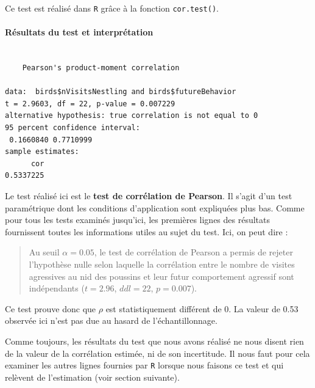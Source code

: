 \documentclass[a4paperpaper,]{article}
\newenvironment{Shaded}{\begin{snugshade}}{\end{snugshade}}
\newcommand{\KeywordTok}[1]{\textcolor[rgb]{0.12,0.11,0.11}{\textbf{#1}}}
\newcommand{\NormalTok}[1]{\textcolor[rgb]{0.12,0.11,0.11}{#1}}
\newcommand{\OperatorTok}[1]{\textcolor[rgb]{0.12,0.11,0.11}{#1}}
\let\oldparagraph\paragraph
\renewcommand{\paragraph}[1]{\oldparagraph{#1}\mbox{}}
\begin{document}
Ce test est réalisé dans \texttt{R} grâce à la fonction \texttt{cor.test()}.

\hypertarget{ruxe9sultats-du-test-et-interpruxe9tation}{%
\paragraph{Résultats du test et interprétation}\label{ruxe9sultats-du-test-et-interpruxe9tation}}

\begin{Shaded}
\end{Shaded}

\begin{verbatim}

    Pearson's product-moment correlation

data:  birds$nVisitsNestling and birds$futureBehavior
t = 2.9603, df = 22, p-value = 0.007229
alternative hypothesis: true correlation is not equal to 0
95 percent confidence interval:
 0.1660840 0.7710999
sample estimates:
      cor 
0.5337225 
\end{verbatim}

Le test réalisé ici est le \textbf{test de corrélation de Pearson}. Il s'agit d'un test paramétrique dont les conditions d'application sont expliquées plus bas. Comme pour tous les tests examinés jusqu'ici, les premières lignes des résultats fournissent toutes les informations utiles au sujet du test. Ici, on peut dire :

\begin{quote}
Au seuil \(\alpha = 0.05\), le test de corrélation de Pearson a permis de rejeter l'hypothèse nulle selon laquelle la corrélation entre le nombre de visites agressives au nid des poussins et leur futur comportement agressif sont indépendants (\(t = 2.96\), \(ddl = 22\), \(p = 0.007\)).
\end{quote}

Ce test prouve donc que \(\rho\) est statistiquement différent de 0. La valeur de 0.53 observée ici n'est pas due au hasard de l'échantillonnage.

Comme toujours, les résultats du test que nous avons réalisé ne nous disent rien de la valeur de la corrélation estimée, ni de son incertitude. Il nous faut pour cela examiner les autres lignes fournies par \texttt{R} lorsque nous faisons ce test et qui relèvent de l'estimation (voir section suivante).
\end{document}
